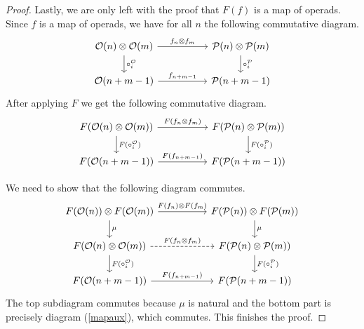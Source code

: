 \documentclass[Thesis.tex]{subfiles}
\begin{document}
\begin{proof}
   Lastly, we are only left with the proof that $F(f)$ is a map of operads. Since $f$ is a map of operads, we have for all $n$ the following commutative diagram.
   \[
\begin{tikzcd}[column sep = 5em]
\OO(n)\otimes \OO(m)\arrow[r, "f_n\otimes f_m"]\arrow[d, "\circ_i^\OO"] & \PP(n)\otimes\PP(m)\arrow[d, "\circ_i^\PP"]\\
\OO(n+m-1)\arrow[r, "f_{n+m-1}"] & \PP(n+m-1)
\end{tikzcd}   
   \]
   After applying $F$ we get the following commutative diagram.
   \begin{equation}\label{mapaux}
   \begin{tikzcd}[column sep = 5em]
F(\OO(n)\otimes \OO(m))\arrow[r, "F(f_n\otimes f_m)"]\arrow[d, "F(\circ_i^\OO)"] & F(\PP(n)\otimes\PP(m))\arrow[d, "F(\circ_i^\PP)"]\\
F(\OO(n+m-1))\arrow[r, "F(f_{n+m-1})"] & F(\PP(n+m-1))
\end{tikzcd} 
   \end{equation}
   
   We need to show that the following diagram commutes.
   \[
   \begin{tikzcd}[column sep = 5em]
F(\OO(n))\otimes F(\OO(m))\arrow[r, "F(f_n)\otimes F(f_m)"]\arrow[d,"\mu"] & F(\PP(n))\otimes F(\PP(m))\arrow[d, "\mu"]\\
F(\OO(n)\otimes \OO(m))\arrow[r, dashed, "F(f_n\otimes f_m)"]\arrow[d, "F(\circ_i^\OO)"] & F(\PP(n)\otimes\PP(m))\arrow[d, "F(\circ_i^\PP)"]\\
F(\OO(n+m-1))\arrow[r, "F(f_{n+m-1})"] & F(\PP(n+m-1))
\end{tikzcd}    
   \]
   The top subdiagram commutes because $\mu$ is natural and the bottom part is precisely diagram  (\ref{mapaux}), which commutes. This finishes the proof.
\end{proof}



\end{document}
